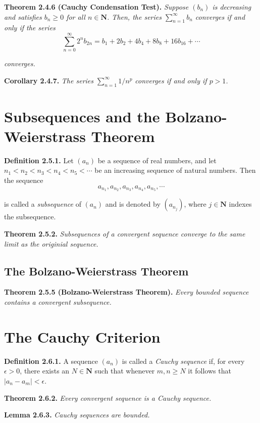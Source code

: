 \documentclass[12pt]{report}
\newcommand{\N}{\textbf{N}}
\begin{document}
\noindent \textbf{Theorem 2.4.6 (Cauchy Condensation Test).} \textit{Suppose $(b_n)$ is decreasing and satisfies $b_n\geq 0$ for all $n\in\N$.  Then, the series $\sum_{n=1}^\infty b_n$ converges if and only if the series}
\[\sum_{n=0}^\infty 2^nb_{2n}=b_1+2b_2+4b_4+8b_8+16b_{16}+\cdots\]

\noindent \textit{converges.}
\bigskip

\noindent \textbf{Corollary 2.4.7.} \textit{The series $\sum_{n=1}^\infty 1/n^p$ converges if and only if $p>1$.}
\bigskip

\section{Subsequences and the Bolzano-Weierstrass Theorem}

\noindent \textbf{Definition 2.5.1.} Let $(a_n)$ be a sequence of real numbers, and let $n_1<n_2<n_3<n_4<n_5<\cdots$ be an increasing sequence of natural numbers.  Then the sequence
\[a_{n_1},a_{n_2},a_{n_3},a_{n_4},a_{n_5},\cdots\]

\noindent is called a \textit{subsequence} of $(a_n)$ and is denoted by $(a_{n_j})$, where $j\in\N$ indexes the subsequence.
\bigskip

\noindent \textbf{Theorem 2.5.2.} \textit{Subsequences of a convergent sequence converge to the same limit as the originial sequence.}
\bigskip

\subsection*{The Bolzano-Weierstrass Theorem}

\noindent \textbf{Theorem 2.5.5 (Bolzano-Weierstrass Theorem).} \textit{Every bounded sequence contains a convergent subsequence.}
\bigskip

\section{The Cauchy Criterion}

\noindent \textbf{Definition 2.6.1.} A sequence $(a_n)$ is called a \textit{Cauchy sequence} if, for every $\epsilon>0$, there exists an $N\in\N$ such that whenever $m,n\geq N$ it follows that $|a_n-a_m|<\epsilon$.
\bigskip

\noindent \textbf{Theorem 2.6.2.} \textit{Every convergent sequence is a Cauchy sequence.}
\bigskip

\noindent \textbf{Lemma 2.6.3.} \textit{Cauchy sequences are bounded.}
\bigskip
\end{document}
